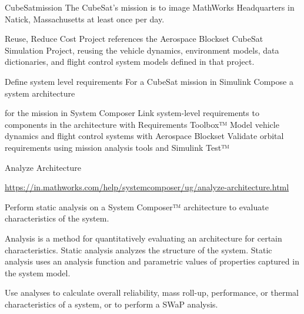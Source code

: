 \begin{frame}
\begin{block}{ CubeSatmission}
  The CubeSat's mission is to image MathWorks Headquarters in Natick, Massachusetts at least once per day.  
\end{block}
\end{frame}

\begin{frame}
\begin{block}{ Reuse, Reduce Cost}
 Project references the Aerospace Blockset CubeSat Simulation Project, reusing the vehicle dynamics, environment models, data dictionaries, and flight control system models defined in that project.
\end{block}
\end{frame}


\begin{frame}
\begin{block}{Define system level requirements}
For a CubeSat mission in Simulink Compose a system architecture

  for the mission in System Composer Link system-level requirements to components in the architecture with Requirements Toolbox™ Model vehicle dynamics and flight control systems with Aerospace Blockset Validate orbital requirements using mission analysis tools and Simulink Test™
\end{block}
\end{frame}

\begin{frame}
\begin{block}{Analyze Architecture }


\url{ https://in.mathworks.com/help/systemcomposer/ug/analyze-architecture.html}


 Perform static analysis on a System Composer™ architecture to evaluate characteristics of the system.

Analysis is a method for quantitatively evaluating an architecture for certain characteristics. Static analysis analyzes the structure of the system. Static analysis uses an analysis function and parametric values of properties captured in the system model.

Use analyses to calculate overall reliability, mass roll-up, performance, or thermal characteristics of a system, or to perform a SWaP analysis.



\end{block}
\end{frame}



